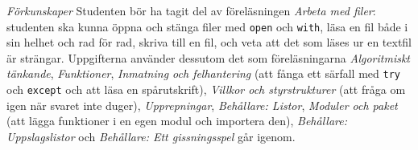\emph{Förkunskaper}
Studenten bör ha tagit del av föreläsningen \emph{Arbeta med filer}:
studenten ska kunna öppna och stänga filer med \texttt{open}
och \texttt{with}, läsa en fil både i sin helhet och rad för
rad, skriva till en fil, och veta att det som läses ur en textfil är
strängar.  Uppgifterna använder dessutom det som föreläsningarna
\emph{Algoritmiskt tänkande}, \emph{Funktioner}, \emph{Inmatning och
felhantering} (att fånga ett särfall med \texttt{try} och
\texttt{except} och att läsa en spårutskrift), \emph{Villkor
och styrstrukturer} (att fråga om igen när svaret inte duger),
\emph{Upprepningar}, \emph{Behållare: Listor}, \emph{Moduler och paket}
(att lägga funktioner i en egen modul och importera den),
\emph{Behållare: Uppslagslistor} och \emph{Behållare: Ett gissningsspel}
går igenom.
